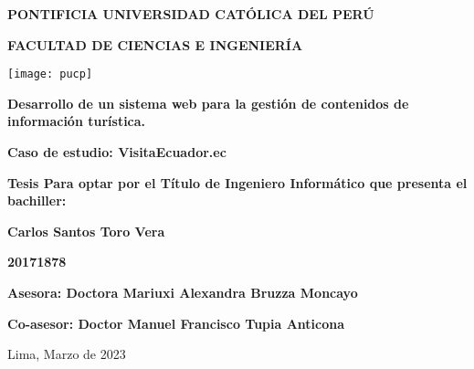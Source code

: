 \begin{titlepage}
    \begin{center}
        \vspace*{1cm}
        \Large
        \textbf{PONTIFICIA UNIVERSIDAD CATÓLICA DEL PERÚ}

        \vspace{0.5cm}
        \textbf{FACULTAD DE CIENCIAS E INGENIERÍA}

        \vspace{0.5cm}
        \texttt{[image: pucp]}

        \vspace{1.5cm}
        \textbf{Desarrollo de un sistema web para la gestión de contenidos de información turística.}

        \textbf{Caso de estudio: VisitaEcuador.ec}

        \normalsize
        \vspace{3.5cm}
        \textbf{Tesis Para optar por el Título de Ingeniero Informático que presenta el bachiller:}

        \Large
        \vspace{1.5cm}
        \textbf{Carlos Santos Toro Vera}

        \vspace{0.3cm}
        \textbf{20171878}

        \vspace{2.5cm}
        \textbf{Asesora: Doctora Mariuxi Alexandra Bruzza Moncayo}

        \textbf{Co-asesor: Doctor Manuel Francisco Tupia Anticona}

        \normalsize
        \vspace{2.5cm}
        {Lima, Marzo de 2023}
    \end{center}
\end{titlepage}

